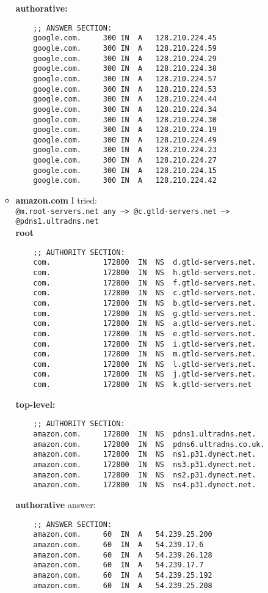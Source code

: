 \documentclass[11pt]{article}
\newenvironment{problem}[2][Problem]{\begin{trivlist}
\item[\hskip \labelsep {\bfseries #1}\hskip \labelsep {\bfseries #2.}]}{\end{trivlist}}
\begin{document}
\begin{problem}{2}
\begin{enumerate}
\begin{itemize}
		 \textbf{authorative:}
		 \\
		 \begin{verbatim}
    ;; ANSWER SECTION:
    google.com.		300	IN	A	128.210.224.45
    google.com.		300	IN	A	128.210.224.59
    google.com.		300	IN	A	128.210.224.29
    google.com.		300	IN	A	128.210.224.38
    google.com.		300	IN	A	128.210.224.57
    google.com.		300	IN	A	128.210.224.53
    google.com.		300	IN	A	128.210.224.44
    google.com.		300	IN	A	128.210.224.34
    google.com.		300	IN	A	128.210.224.30
    google.com.		300	IN	A	128.210.224.19
    google.com.		300	IN	A	128.210.224.49
    google.com.		300	IN	A	128.210.224.23
    google.com.		300	IN	A	128.210.224.27
    google.com.		300	IN	A	128.210.224.15
    google.com.		300	IN	A	128.210.224.42
		 \end{verbatim}
		\item \textbf{amazon.com} I tried:\\
		\texttt{@m.root-servers.net any --> @c.gtld-servers.net --> @pdns1.ultradns.net}\\
		\textbf{root}
		\begin{verbatim}
    ;; AUTHORITY SECTION:
    com.			172800	IN	NS	d.gtld-servers.net.
    com.			172800	IN	NS	h.gtld-servers.net.
    com.			172800	IN	NS	f.gtld-servers.net.
    com.			172800	IN	NS	c.gtld-servers.net.
    com.			172800	IN	NS	b.gtld-servers.net.
    com.			172800	IN	NS	g.gtld-servers.net.
    com.			172800	IN	NS	a.gtld-servers.net.
    com.			172800	IN	NS	e.gtld-servers.net.
    com.			172800	IN	NS	i.gtld-servers.net.
    com.			172800	IN	NS	m.gtld-servers.net.
    com.			172800	IN	NS	l.gtld-servers.net.
    com.			172800	IN	NS	j.gtld-servers.net.
    com.			172800	IN	NS	k.gtld-servers.net
		\end{verbatim}
		\textbf{top-level:}
		\begin{verbatim}
    ;; AUTHORITY SECTION:
    amazon.com.		172800	IN	NS	pdns1.ultradns.net.
    amazon.com.		172800	IN	NS	pdns6.ultradns.co.uk.
    amazon.com.		172800	IN	NS	ns1.p31.dynect.net.
    amazon.com.		172800	IN	NS	ns3.p31.dynect.net.
    amazon.com.		172800	IN	NS	ns2.p31.dynect.net.
    amazon.com.		172800	IN	NS	ns4.p31.dynect.net.
		\end{verbatim}
		\textbf{authorative} answer:
		\begin{verbatim}
    ;; ANSWER SECTION:
    amazon.com.		60	IN	A	54.239.25.200
    amazon.com.		60	IN	A	54.239.17.6
    amazon.com.		60	IN	A	54.239.26.128
    amazon.com.		60	IN	A	54.239.17.7
    amazon.com.		60	IN	A	54.239.25.192
    amazon.com.		60	IN	A	54.239.25.208
		\end{verbatim}
	\end{itemize}
\end{enumerate}
\end{problem}
\end{document}
